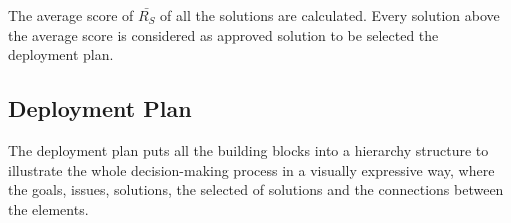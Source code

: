 The average score of $\bar{R_{S}}$ of all the solutions are calculated. Every solution above the average score is considered as approved solution to be selected the deployment plan.


\subsection{Deployment Plan}
The deployment plan puts all the building blocks into a hierarchy structure to illustrate the whole decision-making process in a visually expressive way, where the goals, issues, solutions, the selected of solutions and the connections between the elements.





